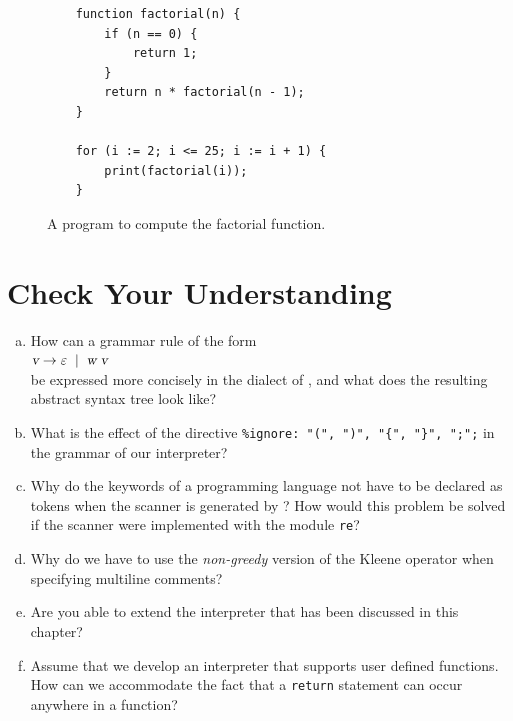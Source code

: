 \begin{figure}[!ht]
\centering
\begin{verbatim}
    function factorial(n) {
        if (n == 0) {
            return 1;
        }
        return n * factorial(n - 1);
    }
    
    for (i := 2; i <= 25; i := i + 1) {
        print(factorial(i));
    }                 
\end{verbatim}
\vspace*{-0.3cm}
\caption{A program to compute the factorial function.}
\label{fig:factorial.sl}
\end{figure}

\section{Check Your Understanding}
\begin{enumerate}[(a)]
\item How can a grammar rule of the form
      \\[0.2cm]
      \hspace*{1.3cm}
      $\textsl{v} \rightarrow \varepsilon \;\mid\; \textsl{w}\; \textsl{v}$
      \\[0.2cm]
      be expressed more concisely in the  dialect of , and what does the
      resulting abstract syntax tree look like?
\item What is the effect of the directive \verb|%ignore: "(", ")", "{", "}", ";";| in the grammar of our
      interpreter?
\item Why do the keywords of a programming language not have to be declared as tokens when the scanner is
      generated by ?  How would this problem be solved if the scanner were implemented with
      the module \texttt{re}?
\item Why do we have to use the \emph{non-greedy} version of the Kleene operator when specifying multiline
      comments?
\item Are you able to extend the interpreter that has been discussed in this chapter?
\item Assume that we develop an interpreter that supports user defined functions.
      How can we accommodate the fact that a \texttt{return} statement can occur anywhere in a function?
\end{enumerate}


